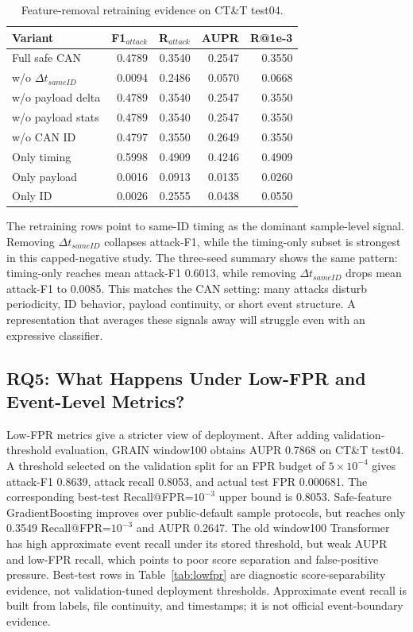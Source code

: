 \documentclass[runningheads]{llncs}%
\newcommand{\attf}{F1$_{attack}$}
\newcommand{\ratt}{R$_{attack}$}
\begin{document}
\begin{table}[!htbp]
\caption{Feature-removal retraining evidence on CT\&T test04.}
\label{tab:mechanism}
\centering
\small
\begin{tabular*}{0.98\textwidth}{@{\extracolsep{\fill}}lrrrr@{}}
\hline
Variant & \attf & \ratt & AUPR & R@1e-3 \\
\hline
Full safe CAN & 0.4789 & 0.3540 & 0.2547 & 0.3550 \\
w/o $\Delta t_{sameID}$ & 0.0094 & 0.2486 & 0.0570 & 0.0668 \\
w/o payload delta & 0.4789 & 0.3540 & 0.2547 & 0.3550 \\
w/o payload stats & 0.4789 & 0.3540 & 0.2547 & 0.3550 \\
w/o CAN ID & 0.4797 & 0.3550 & 0.2649 & 0.3550 \\
Only timing & 0.5998 & 0.4909 & 0.4246 & 0.4909 \\
Only payload & 0.0016 & 0.0913 & 0.0135 & 0.0260 \\
Only ID & 0.0026 & 0.2555 & 0.0438 & 0.0550 \\
\hline
\end{tabular*}
\end{table}

The retraining rows point to same-ID timing as the dominant sample-level signal.  Removing $\Delta t_{sameID}$ collapses attack-F1, while the timing-only subset is strongest in this capped-negative study.  The three-seed summary shows the same pattern: timing-only reaches mean attack-F1 0.6013, while removing $\Delta t_{sameID}$ drops mean attack-F1 to 0.0085.  This matches the CAN setting: many attacks disturb periodicity, ID behavior, payload continuity, or short event structure.  A representation that averages these signals away will struggle even with an expressive classifier.

\subsection{RQ5: What Happens Under Low-FPR and Event-Level Metrics?}
Low-FPR metrics give a stricter view of deployment.  After adding validation-threshold evaluation, GRAIN window100 obtains AUPR 0.7868 on CT\&T test04.  A threshold selected on the validation split for an FPR budget of $5\times10^{-4}$ gives attack-F1 0.8639, attack recall 0.8053, and actual test FPR 0.000681.  The corresponding best-test Recall@FPR=$10^{-3}$ upper bound is 0.8053.  Safe-feature GradientBoosting improves over public-default sample protocols, but reaches only 0.3549 Recall@FPR=$10^{-3}$ and AUPR 0.2647.  The old window100 Transformer has high approximate event recall under its stored threshold, but weak AUPR and low-FPR recall, which points to poor score separation and false-positive pressure.  Best-test rows in Table~\ref{tab:lowfpr} are diagnostic score-separability evidence, not validation-tuned deployment thresholds.  Approximate event recall is built from labels, file continuity, and timestamps; it is not official event-boundary evidence.
\end{document}
